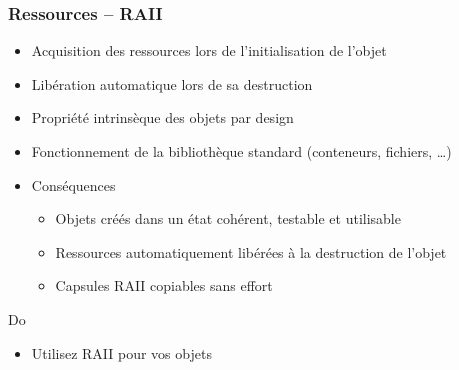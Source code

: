 \documentclass[C++.tex]{subfiles}
\begin{document}
\begin{frame}[fragile]
	\frametitle{Ressources -- RAII}


	\begin{itemize}
		\item Acquisition des ressources lors de l'initialisation de l'objet
		\item Libération automatique lors de sa destruction


		\item Propriété intrinsèque des objets par design


		\item Fonctionnement de la bibliothèque standard (conteneurs, fichiers, \ldots{})
		\item Conséquences
		\begin{itemize}
			\item Objets créés dans un état cohérent, testable et utilisable
			\item Ressources automatiquement libérées à la destruction de l'objet


			\item Capsules RAII copiables sans effort
		\end{itemize}
	\end{itemize}

	\begin{exampleblock}{Do}
		\begin{itemize}
			\item Utilisez RAII pour vos objets
		\end{itemize}
	\end{exampleblock}
\end{frame}
\end{document}
